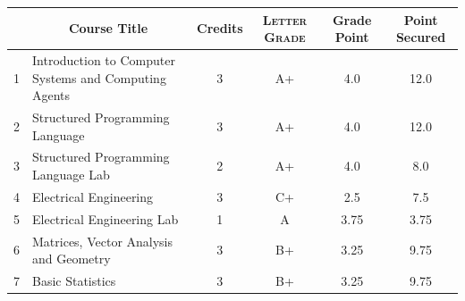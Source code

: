\documentclass[11pt]{article}
\newcommand*{\numtwo}[1]{\pgfmathprintnumber[
                    fixed, precision=2, fixed zerofill=true]{#1}}
\begin{document}
                \begin{center}
                    \renewcommand{\arraystretch}{1.08}
                    
                \begin{tabular}{|c|l|c|>{\scshape}c|c|c|}
                \hline  \rule[-1ex]{0pt}{3.5ex} {\centering{\bf Course Code}} &  \multicolumn{1}{c|}{\textbf{Course Title}}  & {\bf Credits} & {\bf Letter Grade} & {\bf Grade Point} & {\bf Point Secured}  \\ 
                \hline   1 &  Introduction to Computer Systems and Computing Agents		 & 3 & A+ & 4.0 & 12.0 \\ %
                \hline   2 &  Structured Programming Language		 & 3 & A+ & 4.0 & 12.0 \\ %
                \hline   3 &  Structured Programming Language Lab		 & 2 & A+ & 4.0 & 8.0 \\ %
                \hline   4 &  Electrical Engineering		 & 3 & C+ & 2.5 & 7.5 \\ %
                \hline   5 &  Electrical Engineering Lab		 & 1 & A & 3.75 & 3.75 \\ %
                \hline   6 &  Matrices, Vector Analysis and Geometry		 & 3 & B+ & 3.25 & 9.75 \\ %
                \hline   7 &  Basic Statistics		 & 3 & B+ & 3.25 & 9.75 \\ %

\hline                %
                \end{tabular}
                \end{center}
                \renewcommand{\arraystretch}{1.03}
\end{document}
